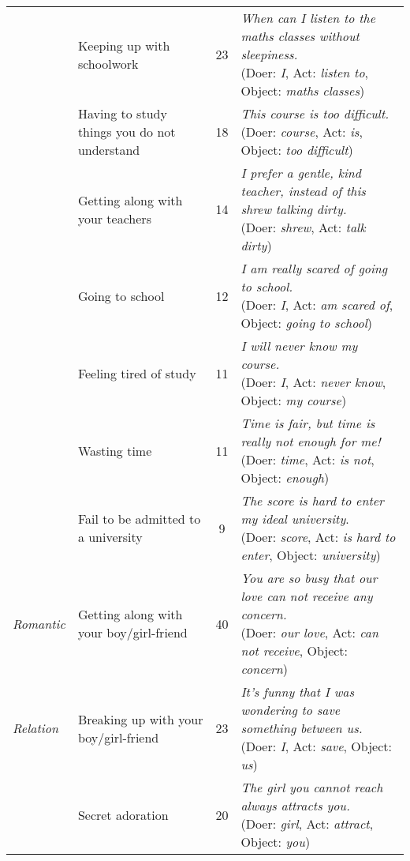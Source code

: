 \begin{table*}
\begin{center}
\begin{footnotesize}
\begin{tabular}{llcl}
&	Keeping up with schoolwork	&	23	&
\tabincell{l}{\emph{When can I listen to the maths classes without sleepiness.}
\\(Doer: \emph{I}, Act: \emph{listen to}, Object: \emph{maths classes})}\\ \cline{2-4}
&	Having to study things you do not understand	&	18	&
\tabincell{l}{\emph{This course is too difficult.}
\\(Doer: \emph{course}, Act: \emph{is}, Object: \emph{too difficult})}\\ \cline{2-4}
&	Getting along with your teachers	&	14	&
\tabincell{l}{\emph{I prefer a gentle, kind teacher, instead of this shrew talking dirty.}
\\(Doer: \emph{shrew}, Act: \emph{talk dirty})}\\ \cline{2-4}
&	Going to school	&	12	&
\tabincell{l}{\emph{I am really scared of going to school.}
\\(Doer: \emph{I}, Act: \emph{am scared of}, Object: \emph{going to school})}\\ \cline{2-4}
&	Feeling tired of study	&	11	&
\tabincell{l}{\emph{I will never know my course.}
\\(Doer: \emph{I}, Act: \emph{never know}, Object: \emph{my course})}\\ \cline{2-4}
&	Wasting time	&	11	&
\tabincell{l}{\emph{Time is fair, but time is really not enough for me!}
\\(Doer: \emph{time}, Act: \emph{is not}, Object: \emph{enough})}\\ \cline{2-4}
&	Fail to be admitted to a university	&	9	&
\tabincell{l}{\emph{The score is hard to enter my ideal university}.
\\(Doer: \emph{score}, Act: \emph{is hard to enter}, Object: \emph{university})}\\  \hline
\emph{Romantic}&	Getting along with your boy/girl-friend	&	40	&
\tabincell{l}{\emph{You are so busy that our love can not receive any concern.}
\\(Doer: \emph{our love}, Act: \emph{can not receive}, Object: \emph{concern})}\\  \cline{2-4}
\emph{Relation} &	Breaking up with your boy/girl-friend	&	23	&
\tabincell{l}{\emph{It's funny that I was wondering to save something between us.}
\\(Doer: \emph{I}, Act: \emph{save}, Object: \emph{us})}\\  \cline{2-4}
&	Secret adoration	&	20	&
\tabincell{l}{\emph{The girl you cannot reach always attracts you.}
\\(Doer: \emph{girl}, Act: \emph{attract}, Object: \emph{you})}\\  \cline{2-4}

\end{tabular}
\end{footnotesize}
\end{center}
\end{table*}
